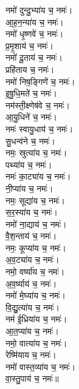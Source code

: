 \begin{multicols}{2}
\begin{flushleft}
नमो॑ दुन्दु॒भ्या॑य च॒ नमः॑।\\
आ॒ह॒न॒न्या॑य च॒ नमः॑।\\
नमो॑ धृ॒ष्णवे॑ च॒ नमः॑।\\
प्र॒मृ॒शाय॑ च॒ नमः॑।\\
नमो॑ दू॒ताय॑ च॒ नमः॑।\\
प्रहि॑ताय च॒ नमः॑।\\
नमो॑ निष॒ङ्गिणे॑ च॒ नमः॑।\\
इ॒षु॒धि॒मते॑ च॒ नमः॑।\\
नम॑स्ती॒क्ष्णेष॑वे च॒ नमः॑।\\
आ॒यु॒धिने॑ च॒ नमः॑।\hfill {}\\
नमः॑ स्वायु॒धाय॑ च॒ नमः॑।\\
सु॒धन्व॑ने च॒ नमः॑।\\
नमः॒ स्रुत्या॑य च॒ नमः॑।\\
पथ्या॑य च॒ नमः॑।\\
नमः॑ का॒ट्या॑य च॒ नमः॑।\\
नी॒प्या॑य च॒ नमः॑।\\
नमः॒ सूद्या॑य च॒ नमः॑।\\
स॒र॒स्या॑य च॒ नमः॑।\\
नमो॑ ना॒द्याय॑ च॒ नमः॑।\\
वै॒श॒न्ताय॑ च॒ नमः॑।\hfill {}\\
नमः॒ कूप्या॑य च॒ नमः॑।\\
अ॒व॒ट्या॑य च॒ नमः॑।\\
नमो॒ वर्ष्या॑य च॒ नमः॑।\\
अ॒व॒र्ष्याय॑ च॒ नमः॑।\\
नमो॑ मे॒घ्या॑य च॒ नमः॑।\\
वि॒द्यु॒त्या॑य च॒ नमः॑।\\
नम॑ ई॒ध्रिया॑य च॒ नमः॑।\\
आ॒त॒प्या॑य च॒ नमः॑।\\
नमो॒ वात्या॑य च॒ नमः॑।\\
रेष्मि॑याय च॒ नमः॑।\hfill {}\\
नमो॑ वास्त॒व्या॑य च॒ नमः॑।\\
वा॒स्तु॒पाय॑ च॒ नमः॑॥\\


\end{flushleft}
\end{multicols}
